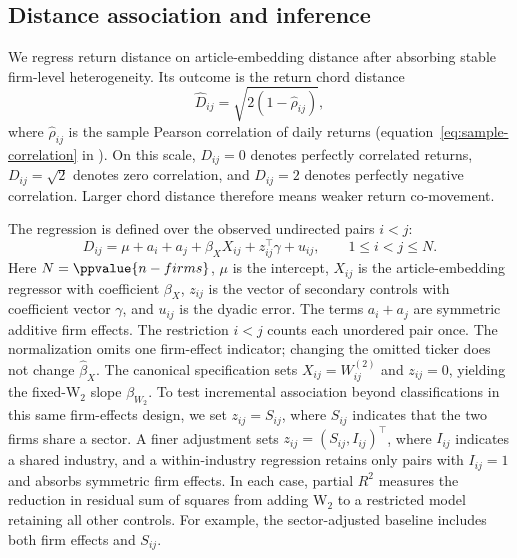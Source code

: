 \subsection{Distance association and inference}
\label{sec:testable-restrictions}
\label{sec:primary-estimator}\label{sec:empirical-testing}
\label{sec:inference-design}

We regress return distance on article-embedding distance after absorbing
stable firm-level heterogeneity.
Its outcome is the return chord distance
\begin{equation}\label{eq:chord-distance}
  \hat{D}_{ij} = \sqrt{2(1 - \hat{\rho}_{ij})},
\end{equation}
where $\hat{\rho}_{ij}$ is the sample Pearson correlation of daily returns
(equation~\ref{eq:sample-correlation} in ).
On this scale, $D_{ij}=0$ denotes perfectly correlated returns,
$D_{ij}=\sqrt{2}$ denotes zero correlation, and $D_{ij}=2$ denotes perfectly
negative correlation.
Larger chord distance therefore means weaker return co-movement.

The regression is defined over the observed undirected pairs $i<j$:
\begin{equation}\label{eq:dyadic-fixed-effects}
  D_{ij}=\mu+a_i+a_j+\beta_X X_{ij}+z_{ij}^{\top}\gamma+u_{ij},
  \qquad 1\le i<j\le N.
\end{equation}
Here $N=\ppvalue{n-firms}$, $\mu$ is the intercept, $X_{ij}$ is the
article-embedding regressor with coefficient $\beta_X$, $z_{ij}$ is the
vector of secondary controls with coefficient vector $\gamma$, and $u_{ij}$
is the dyadic error.
The terms $a_i+a_j$ are symmetric additive firm effects.
The restriction $i<j$ counts each unordered pair once.
The normalization omits one firm-effect indicator; changing the omitted
ticker does not change $\widehat\beta_X$.
The canonical specification sets $X_{ij}=W^{(2)}_{ij}$ and $z_{ij}=0$,
yielding the fixed-W$_2$ slope $\beta_{W_2}$.
To test incremental association beyond classifications in this same
firm-effects design, we set $z_{ij}=S_{ij}$, where $S_{ij}$ indicates that
the two firms share a sector.
A finer adjustment sets $z_{ij}=(S_{ij},I_{ij})^{\top}$, where $I_{ij}$
indicates a shared industry, and a within-industry regression retains only
pairs with $I_{ij}=1$ and absorbs symmetric firm effects.
In each case, partial $R^2$ measures the reduction in residual sum of
squares from adding W$_2$ to a restricted model retaining all other controls.
For example, the sector-adjusted baseline includes both firm effects and
$S_{ij}$.


